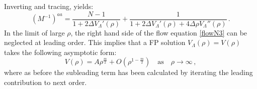 \documentclass[11pt,a4paper]{article}
\numberwithin{figure}{section}
\numberwithin{equation}{section}
\begin{document}
Inverting and tracing, yields:
\begin{equation} \label{trace}
    \left( M^{-1} \right)^{aa} = \frac{N-1}{1 + 2 \Delta V_\Lambda'(\rho)} + \frac{1}{1 + 2 \Delta V_\Lambda'(\rho) + 4 \Delta \rho V_\Lambda''(\rho)} \,.
\end{equation}
In the limit of large $\rho$, the right hand side of the flow equation \eqref{flowN3} can be neglected at leading order. This implies that a FP solution $V_\Lambda(\rho) = V(\rho)$ takes the following asymptotic form:
\begin{equation} \label{FPN}
    V(\rho) = A \rho^{\frac{m}{2}} + O\left(\rho^{1-\frac{m}{2}}\right) \quad \text{as} \quad \rho \rightarrow \infty \,,
\end{equation}
where as before the subleading term has been calculated by iterating the leading contribution to next order.
\end{document}
